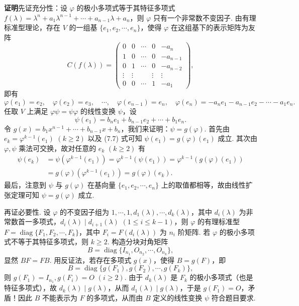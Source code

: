 \documentclass[UTF8,12pt,a4paper,fontset=fandol]{ctexart}
\begin{document}
\noindent\textbf{证明}\quad 先证充分性：设 $\varphi$ 的极小多项式等于其特征多项式 $f(\lambda)=\lambda^n+a_1\lambda^{n-1}+\cdots+a_{n-1}\lambda+a_n$，则 $\varphi$ 只有一个非常数不变因子. 由有理标准型理论，存在 $V$ 的一组基 $\{e_1,e_2,\cdots,e_n\}$，使得 $\varphi$ 在这组基下的表示矩阵为友阵
\[
C(f(\lambda))=
\left(\begin{array}{ccccc}
0 & 0 & \cdots & 0 & -a_n\\
1 & 0 & \cdots & 0 & -a_{n-1}\\
0 & 1 & \cdots & 0 & -a_{n-2}\\
\vdots & \vdots &        & \vdots & \vdots\\
0 & 0 & \cdots & 1 & -a_1
\end{array}\right),
\]
即有
\[
\varphi(e_1)=e_2,\quad \varphi(e_2)=e_3,\quad\cdots,\quad
\varphi(e_{n-1})=e_n,\quad \varphi(e_n)=-a_ne_1-a_{n-1}e_2-\cdots-a_1e_n.
\]
任取 $V$ 上满足 $\varphi\psi=\psi\varphi$ 的线性变换 $\psi$，设
\begin{equation}
\psi(e_1)=b_ne_1+b_{n-1}e_2+\cdots+b_1e_n.
\tag{7.7}
\end{equation}
令 $g(x)=b_1x^{n-1}+\cdots+b_{n-1}x+b_n$，我们来证明：$\psi=g(\varphi)$. 首先由 $e_k=\varphi^{k-1}(e_1)$ $(k\ge 2)$ 以及 (7.7) 式可知 $\psi(e_1)=g(\varphi)(e_1)$ 成立. 其次由 $\varphi,\psi$ 乘法可交换，故对任意的 $e_k$ $(k\ge 2)$ 有
\[
\begin{aligned}
\psi(e_k)
&=\psi(\varphi^{k-1}(e_1))=\varphi^{k-1}(\psi(e_1))
=\varphi^{k-1}(g(\varphi)(e_1))\\
&=g(\varphi)(\varphi^{k-1}(e_1))=g(\varphi)(e_k).
\end{aligned}
\]
最后，注意到 $\psi$ 与 $g(\varphi)$ 在基向量 $\{e_1,e_2,\cdots,e_n\}$ 上的取值都相等，故由线性扩张定理可知 $\psi=g(\varphi)$ 成立.

再证必要性. 设 $\varphi$ 的不变因子组为 $1,\cdots,1,d_1(\lambda),\cdots,d_k(\lambda)$，其中 $d_i(\lambda)$ 为非常数首一多项式，$d_i(\lambda)\mid d_{i+1}(\lambda)$ $(1\le i\le k-1)$，则 $\varphi$ 的有理标准型 $F=\operatorname{diag}\{F_1,F_2,\cdots,F_k\}$，其中 $F_i=F(d_i(\lambda))$ 为 $n_i$ 阶矩阵. 若 $\varphi$ 的极小多项式不等于其特征多项式，则 $k\ge 2$. 构造分块对角矩阵
\[
B=\operatorname{diag}\{I_{n_1},O_{n_2},\cdots,O_{n_k}\},
\]
显然 $BF=FB$. 用反证法，若存在多项式 $g(x)$，使得 $B=g(F)$，即
\[
B=\operatorname{diag}\{g(F_1),g(F_2),\cdots,g(F_k)\},
\]
则 $g(F_1)=I_{n_1},g(F_i)=O$ $(i\ge 2)$. 由于 $d_k(\lambda)$ 是 $F_k$ 的极小多项式（也是特征多项式），故 $d_k(\lambda)\mid g(\lambda)$，从而 $d_1(\lambda)\mid g(\lambda)$，于是 $g(F_1)=O$，矛盾！因此 $B$ 不能表示为 $F$ 的多项式，从而由 $B$ 定义的线性变换 $\psi$ 符合题目要求.
\end{document}
